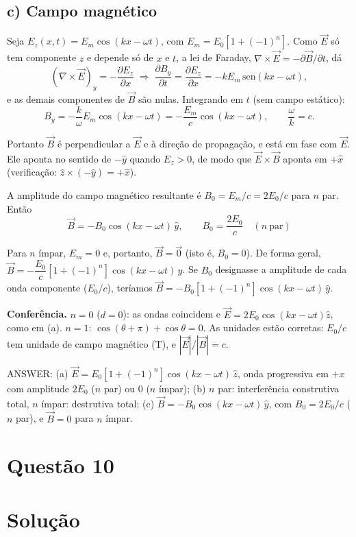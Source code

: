 \documentclass{article}%
\begin{document}
\subsection*{c) Campo magnético}

Seja $E_z(x,t)=E_m\cos(kx-\omega t)$, com $E_m=E_0[1+(-1)^n]$. Como $\vec E$ só tem componente $z$ e depende só de $x$ e $t$, a lei de Faraday, $\nabla\times\vec E=-\partial\vec B/\partial t$, dá
\[
(\nabla\times\vec E)_y=-\frac{\partial E_z}{\partial x}
\;\Rightarrow\;
\frac{\partial B_y}{\partial t}=\frac{\partial E_z}{\partial x}=-kE_m\,\mathrm{sen}(kx-\omega t),
\]
e as demais componentes de $\vec B$ são nulas. Integrando em $t$ (sem campo estático):
\[
B_y=-\frac{k}{\omega}E_m\cos(kx-\omega t)=-\frac{E_m}{c}\cos(kx-\omega t),
\qquad \frac{\omega}{k}=c .
\]

Portanto $\vec B$ é perpendicular a $\vec E$ e à direção de propagação, e está em fase com $\vec E$. Ele aponta no sentido de $-\hat y$ quando $E_z>0$, de modo que $\vec E\times\vec B$ aponta em $+\hat x$ (verificação: $\hat z\times(-\hat y)=+\hat x$).

A amplitude do campo magnético resultante é $B_0=E_m/c=2E_0/c$ para $n$ par. Então
\[
\boxed{\vec B=-B_0\cos(kx-\omega t)\,\hat y,\qquad B_0=\frac{2E_0}{c}\quad(n\ \text{par})}
\]

Para $n$ ímpar, $E_m=0$ e, portanto, $\vec B=\vec 0$ (isto é, $B_0=0$). De forma geral, $\vec B=-\dfrac{E_0}{c}\left[1+(-1)^n\right]\cos(kx-\omega t)\,\hat y$. Se $B_0$ designasse a amplitude de cada onda componente ($E_0/c$), teríamos $\vec B=-B_0[1+(-1)^n]\cos(kx-\omega t)\,\hat y$.

\textbf{Conferência.} $n=0$ ($d=0$): as ondas coincidem e $\vec E=2E_0\cos(kx-\omega t)\hat z$, como em (a). $n=1$: $\cos(\theta+\pi)+\cos\theta=0$. As unidades estão corretas: $E_0/c$ tem unidade de campo magnético (T), e $|\vec E|/|\vec B|=c$.

ANSWER: (a) $\vec E=E_0[1+(-1)^n]\cos(kx-\omega t)\,\hat z$, onda progressiva em $+x$ com amplitude $2E_0$ ($n$ par) ou $0$ ($n$ ímpar); (b) $n$ par: interferência construtiva total, $n$ ímpar: destrutiva total; (c) $\vec B=-B_0\cos(kx-\omega t)\,\hat y$, com $B_0=2E_0/c$ ($n$ par), e $\vec B=0$ para $n$ ímpar.%
\newpage%
\section*{Questão 10}

\section*{Solução}
\end{document}

